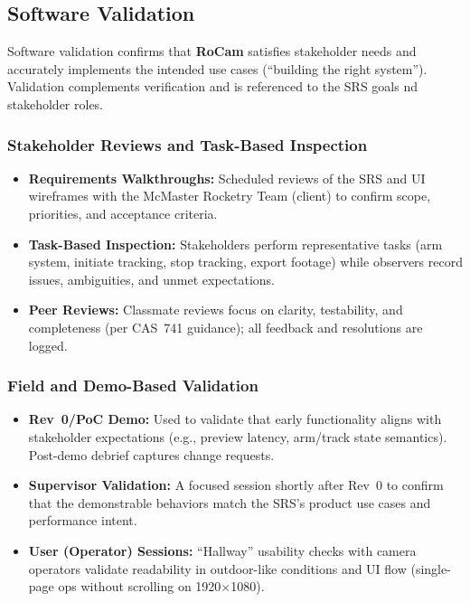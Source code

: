\documentclass[12pt, titlepage]{article}
\begin{document}
\subsection{Software Validation}

Software validation confirms that \textbf{RoCam} satisfies stakeholder needs
and accurately implements the intended use cases (``building the right
system''). Validation complements verification and is referenced to the SRS
goals nd stakeholder roles.

\subsubsection*{Stakeholder Reviews and Task-Based Inspection}
\begin{itemize}
  \item \textbf{Requirements Walkthroughs:} Scheduled reviews of the SRS
        and UI wireframes with the McMaster Rocketry Team (client) to confirm
        scope, priorities, and acceptance criteria.
  \item \textbf{Task-Based Inspection:} Stakeholders perform
        representative tasks (arm system, initiate tracking, stop tracking, export
        footage) while observers record issues, ambiguities, and unmet expectations.
  \item \textbf{Peer Reviews:} Classmate reviews focus on clarity,
        testability, and completeness (per CAS~741 guidance); all feedback and
        resolutions are logged.
\end{itemize}

\subsubsection*{Field and Demo-Based Validation}
\begin{itemize}
  \item \textbf{Rev~0/PoC Demo:} Used to validate that early
        functionality aligns with stakeholder expectations (e.g., preview
        latency, arm/track state semantics). Post-demo debrief captures change
        requests.
  \item \textbf{Supervisor Validation:} A focused session shortly
        after Rev~0 to confirm that the demonstrable behaviors match the
        SRS’s product use cases and performance intent.
  \item \textbf{User (Operator) Sessions:} ``Hallway'' usability
        checks with camera operators validate readability in outdoor-like
        conditions and UI flow (single-page ops without scrolling on 1920$\times$1080).
\end{itemize}
\end{document}
